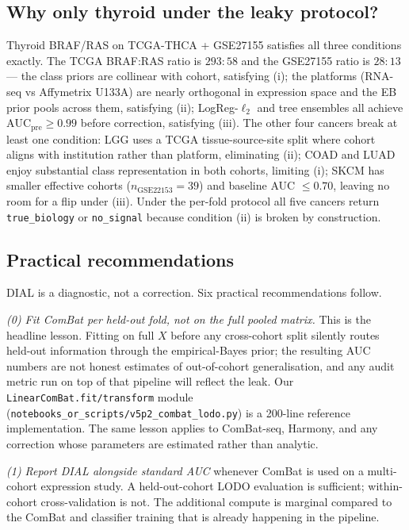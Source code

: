\documentclass[11pt,a4paper]{article}
\begin{document}
\subsection{Why only thyroid under the leaky protocol?}
Thyroid BRAF/RAS on TCGA-THCA + GSE27155 satisfies all three
conditions exactly. The TCGA BRAF:RAS ratio is $293:58$ and the
GSE27155 ratio is $28:13$ --- the class priors are collinear with
cohort, satisfying (i); the platforms (RNA-seq vs Affymetrix U133A)
are nearly orthogonal in expression space and the EB prior pools
across them, satisfying (ii); LogReg-$\ell_2$ and tree ensembles all
achieve $\mathrm{AUC}_{\mathrm{pre}} \geq 0.99$ before correction,
satisfying (iii). The other four cancers break at least one
condition: LGG uses a TCGA tissue-source-site split where cohort
aligns with institution rather than platform, eliminating (ii);
COAD and LUAD enjoy substantial class representation in both
cohorts, limiting (i); SKCM has smaller effective cohorts
($n_{\mathrm{GSE22153}} = 39$) and baseline AUC $\leq 0.70$, leaving
no room for a flip under (iii). Under the per-fold protocol all five
cancers return \texttt{true\_biology} or \texttt{no\_signal} because
condition (ii) is broken by construction.

\subsection{Practical recommendations}
DIAL is a diagnostic, not a correction. Six practical recommendations
follow.

\emph{(0) Fit ComBat per held-out fold, not on the full pooled
matrix.} This is the headline lesson. Fitting on full $X$ before any
cross-cohort split silently routes held-out information through the
empirical-Bayes prior; the resulting AUC numbers are not honest
estimates of out-of-cohort generalisation, and any audit metric run
on top of that pipeline will reflect the leak. Our
\texttt{LinearComBat.fit/transform} module
(\texttt{notebooks\_or\_scripts/v5p2\_combat\_lodo.py}) is a 200-line
reference implementation. The same lesson applies to ComBat-seq,
Harmony, and any correction whose parameters are estimated rather
than analytic.

\emph{(1) Report DIAL alongside standard AUC} whenever ComBat is
used on a multi-cohort expression study. A held-out-cohort LODO
evaluation is sufficient; within-cohort cross-validation is not. The
additional compute is marginal compared to the ComBat and classifier
training that is already happening in the pipeline.
\end{document}
